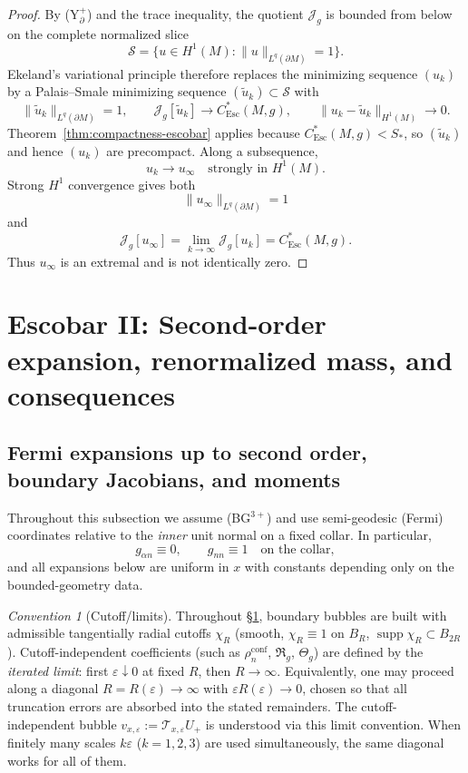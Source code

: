 \documentclass[11pt,reqno,a4paper]{amsart}
\numberwithin{equation}{section}
\theoremstyle{plain}
\newcommand{\Esc}{\ensuremath{\mathrm{Esc}}}
\theoremstyle{remark}
\newtheorem{convention}[theorem]{Convention}
\theoremstyle{plain}
\begin{document}
\begin{proof}
By \textup{(Y$^+_\partial$)} and the trace inequality, the quotient
$\mathcal J_g$ is bounded from below on the complete normalized slice
\[
\mathcal S=\{u\in H^1(M):\|u\|_{L^q(\partial M)}=1\}.
\]
Ekeland's variational principle therefore replaces the minimizing
sequence $(u_k)$ by a Palais--Smale minimizing sequence
$(\tilde u_k)\subset\mathcal S$ with
\[
\|\tilde u_k\|_{L^q(\partial M)}=1,
\qquad
\mathcal J_g[\tilde u_k]\to C^*_{\Esc}(M,g),
\qquad
\|u_k-\tilde u_k\|_{H^1(M)}\to0.
\]
Theorem~\ref{thm:compactness-escobar} applies because
$C^*_{\Esc}(M,g)<S_\ast$, so $(\tilde u_k)$ and hence $(u_k)$ are precompact.
Along a subsequence,
\[
u_k\to u_\infty\quad\text{strongly in }H^1(M).
\]
Strong $H^1$ convergence gives both
\[
\|u_\infty\|_{L^q(\partial M)}=1
\]
and
\[
\mathcal J_g[u_\infty]
=
\lim_{k\to\infty}\mathcal J_g[u_k]
=
C^*_{\Esc}(M,g).
\]
Thus $u_\infty$ is an extremal and is not identically zero.
\end{proof}


\section{Escobar II: Second-order expansion, renormalized mass, and consequences}
\label{sec:escobar-second}


\subsection{Fermi expansions up to second order, boundary Jacobians, and moments}
\label{subsec:fermi-2nd}

Throughout this subsection we assume \textup{(BG$^{3+}$)} and use semi-geodesic (Fermi) coordinates
relative to the \emph{inner} unit normal on a fixed collar. In particular,
\[
g_{\alpha n}\equiv0,\qquad g_{nn}\equiv1\quad\text{on the collar},
\]
and all expansions below are uniform in $x$ with constants depending only on the bounded-geometry data.

\begin{convention}[Cutoff/limits]\label{conv:cutoff-limits}
Throughout \S\ref{sec:escobar-second}, boundary bubbles are built with admissible tangentially radial cutoffs
$\chi_R$ (smooth, $\chi_R\equiv1$ on $B_R$, $\operatorname{supp}\chi_R\subset B_{2R}$).
Cutoff-independent coefficients (such as $\rho_n^{\mathrm{conf}}$, $\mathfrak R_g$, $\Theta_g$) are defined
by the \emph{iterated limit}: first $\varepsilon\downarrow0$ at fixed $R$, then $R\to\infty$.
Equivalently, one may proceed along a diagonal $R=R(\varepsilon)\to\infty$ with $\varepsilon R(\varepsilon)\to0$,
chosen so that all truncation errors are absorbed into the stated remainders.
The cutoff-independent bubble $v_{x,\varepsilon}:=\mathcal T_{x,\varepsilon}U_+$ is understood via this
limit convention. When finitely many scales $k\varepsilon$ ($k=1,2,3$) are used simultaneously,
the same diagonal works for all of them.
\end{convention}
\end{document}
